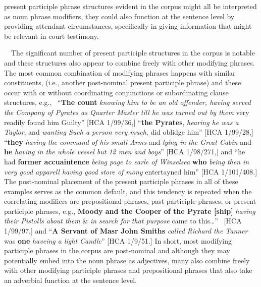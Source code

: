 \begin{styleStandard}
present participle phrase structures evident in the corpus might all be interpreted as noun phrase modifiers, they could also function at the sentence level by providing attendant circumstances, specifically in giving information that might be relevant in court testimony. 
\end{styleStandard}

\begin{styleStandard}
\ \ The significant number of present participle structures in the corpus is notable and these structures also appear to combine freely with other modifying phrases. The most common combination of modifying phrases happens with similar constituents, (i.e., another post-nominal present participle phrase) and these occur with or without coordinating conjunctions or subordinating clause structures, e.g., \ “\textbf{The count} \textit{knowing him to be an old offender, having served the Company of Pyrates as Quarter Master till he was turned out by them} very readily found him Guilty” [HCA 1/99/36,] “\textbf{the Pyrates}, \textit{hearing he was a Taylor}, and \textit{wanting Such a person very much}, did oblidge him” [HCA 1/99/28,] “\textbf{they }\textit{having the command of his small Arms} and \textit{lying in the Great Cabin} and \textbf{he }\textit{having in the whole vessel but 12 men and boys}” [HCA 1/98/271,] and “he had \textbf{former accuaintence} \textit{being page to earle of Winselsea} \textbf{who }\textit{being then in very good apparell having good store of mony }entertayned him” [HCA 1/101/408.] The post-nominal placement of the present participle phrases in all of these examples serves as the common default, and this tendency is repeated when the correlating modifiers are prepositional phrases, past participle phrases, or present participle phrases, e.g., \textbf{Moody and the Cooper of the Pyrate [ship]} \textit{having their Pistolls about them} \& \textit{in search for that purpose }came to this…” ~[HCA 1/99/97,] and “\textbf{A Servant of Masr John Smiths} \textit{called Richard the Tanner }was \textbf{one} \textit{haveing a light Candle}” [HCA 1/9/51.] In short, most modifying participle phrases in the corpus are post-nominal and although they may potentially embed into the noun phrase as adjectives, many also combine freely with other modifying participle phrases and prepositional phrases that also take an adverbial function at the sentence level. 
\end{styleStandard}


